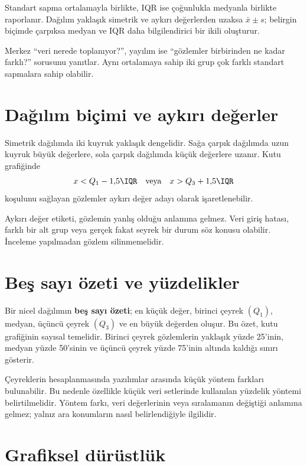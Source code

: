 Standart sapma ortalamayla birlikte, IQR ise çoğunlukla medyanla birlikte
raporlanır. Dağılım yaklaşık simetrik ve aykırı değerlerden uzaksa
$\bar{x}\pm s$; belirgin biçimde çarpıksa medyan ve IQR daha bilgilendirici bir
ikili oluşturur.

\begin{sezgibox}
Merkez ``veri nerede toplanıyor?'', yayılım ise ``gözlemler birbirinden ne
kadar farklı?'' sorusunu yanıtlar. Aynı ortalamaya sahip iki grup çok farklı
standart sapmalara sahip olabilir.
\end{sezgibox}

\section{Dağılım biçimi ve aykırı değerler}
\label{sec:descriptive-shape}

Simetrik dağılımda iki kuyruk yaklaşık dengelidir. Sağa çarpık dağılımda uzun
kuyruk büyük değerlere, sola çarpık dağılımda küçük değerlere uzanır. Kutu
grafiğinde
\[
x<Q_1-1{,}5\IQR \quad\text{veya}\quad x>Q_3+1{,}5\IQR
\]
koşulunu sağlayan gözlemler aykırı değer adayı olarak işaretlenebilir.

\begin{mistakebox}
Aykırı değer etiketi, gözlemin yanlış olduğu anlamına gelmez. Veri giriş
hatası, farklı bir alt grup veya gerçek fakat seyrek bir durum söz konusu
olabilir. İnceleme yapılmadan gözlem silinmemelidir.
\end{mistakebox}

\section{Beş sayı özeti ve yüzdelikler}

Bir nicel dağılımın \textbf{beş sayı özeti}; en küçük değer, birinci çeyrek
$(Q_1)$, medyan, üçüncü çeyrek $(Q_3)$ ve en büyük değerden oluşur. Bu özet,
kutu grafiğinin sayısal temelidir. Birinci çeyrek gözlemlerin yaklaşık yüzde
25'inin, medyan yüzde 50'sinin ve üçüncü çeyrek yüzde 75'inin altında kaldığı
sınırı gösterir.

Çeyreklerin hesaplanmasında yazılımlar arasında küçük yöntem farkları
bulunabilir. Bu nedenle özellikle küçük veri setlerinde kullanılan yüzdelik
yöntemi belirtilmelidir. Yöntem farkı, veri değerlerinin veya sıralamanın
değiştiği anlamına gelmez; yalnız ara konumların nasıl belirlendiğiyle ilgilidir.

\section{Grafiksel dürüstlük}

